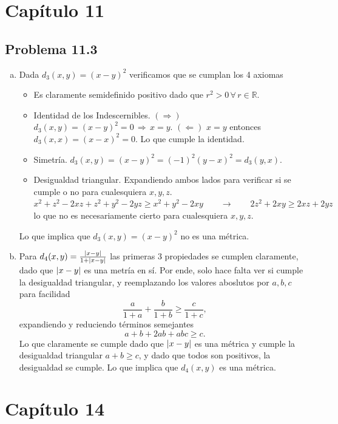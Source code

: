 \documentclass[conference]{IEEEtran}
\newcommand{\R}{\mathbb{R}}
\begin{document}
\section{Capítulo 11}

\subsection{Problema 11.3}
\begin{enumerate}[a)]
	\item Dada $d_3 (x,y) = (x - y)^2$ verificamos que se cumplan los 4 axiomas
		\begin{itemize}
			\item Es claramente semidefinido positivo dado que $r^2 > 0 \, \forall \, r\in \R$.
			\item Identidad de los Indescernibles. $(\Rightarrow)$ $d_3 (x,y) = (x - y)^2 = 0 \, \Rightarrow \, x = y$.
				$(\Leftarrow)$ $x = y$ entonces $d_3 (x,x) = (x - x)^2 = 0$. Lo que cumple la identidad.
			\item Simetría. $d_3 (x,y) = (x - y)^2 = (-1)^2 (y-x)^2 = d_3 (y,x)$.
			\item Desigualdad triangular. Expandiendo ambos lados para verificar si se cumple o no para cualesquiera $x,y,z$. $x^2 + z^2 - 2xz + z^2 + y^2 - 2yz \geq x^2 + y^2 - 2xy \qquad \rightarrow \qquad 2z^2 + 2xy \geq 2xz + 2yz$ lo que no es necesariamente cierto para cualesquiera $x,y,z$.
		\end{itemize}
		Lo que implica que $d_3 (x,y) = (x - y)^2$ no es una métrica.
	\item Para $d_4 (x,y) = \frac{\abs{x - y}}{1 + \abs{x - y}}$ las primeras 3 propiedades se cumplen claramente, dado que $\abs{x - y}$ es una metría en sí. Por ende, solo hace falta ver si cumple la desigualdad triangular, y reemplazando los valores aboslutos por $a,b,c$ para facilidad
		$$ \frac{a}{1+a} + \frac{b}{1+b} \geq \frac{c}{1+c} , $$
	expandiendo y reduciendo términos semejantes
		$$ a + b + 2ab + abc \geq c. $$
	Lo que claramente se cumple dado que $\abs{x-y}$ es una métrica y cumple la desigualdad triangular $a + b \geq c$, y dado que todos son positivos, la desigualdad se cumple. Lo que implica que $d_4 (x,y)$ es una métrica.
\end{enumerate}

\section{Capítulo 14}
\end{document}
